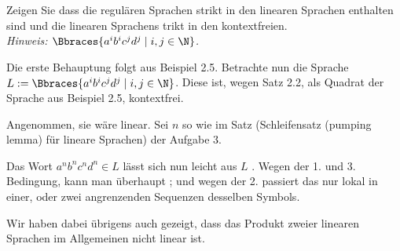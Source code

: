 
\begin{exercise}

Zeigen Sie dass die regulären Sprachen strikt in den linearen Sprachen enthalten sind und die linearen Sprachens trikt in den kontextfreien. \\

\textit{Hinweis: $\Bbraces{a^i b^i c^j d^j \mid i, j \in \N}$.}

\end{exercise}


\begin{solution}

Die erste Behauptung folgt aus Beispiel 2.5.
Betrachte nun die Sprache $L := \Bbraces{a^i b^i c^j d^j \mid i, j \in \N}$.
Diese ist, wegen Satz 2.2, als Quadrat der Sprache aus Beispiel 2.5, kontextfrei.

Angenommen, sie wäre linear.
Sei $n$ so wie im Satz (Schleifensatz (pumping lemma) für lineare Sprachen) der Aufgabe 3.

Das Wort $a^n b^n c^n d^n \in L$ lässt sich nun leicht aus $L$ .
Wegen der 1. und 3. Bedingung, kann man überhaupt ;
und wegen der 2. passiert das nur lokal in einer, oder zwei angrenzenden Sequenzen desselben Symbols.

Wir haben dabei übrigens auch gezeigt, dass das Produkt zweier linearen Sprachen im Allgemeinen nicht linear ist.

\end{solution}

